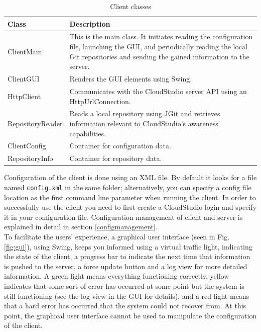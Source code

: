 \begin{table}

    \scriptsize
    \begin{tabularx}{\textwidth}{ | l | X | }
    \hline
\textbf{Class} & \textbf{Description} \\ \hline
ClientMain & This is the main class. It initiates reading the configuration file, launching the GUI, and periodically reading the local Git repositories and sending the gained information to the server. \\ \hline
ClientGUI & Renders the GUI elements using Swing. \\ \hline
HttpClient & Communicates with the CloudStudio server API using an HttpUrlConnection. \\ \hline
RepositoryReader & Reads a local repository using JGit and retrieves information relevant to CloudStudio's awareness capabilities. \\ \hline
ClientConfig & Container for configuration data. \\ \hline
RepositoryInfo & Container for repository data. \\ \hline
    \end{tabularx}
    
    \centering
  \caption{Client classes}
  \label{table:clientclasses}
\end{table}


Configuration of the client is done using an XML file. By default it looks for a file named \texttt{config.xml} in the same folder; alternatively, you can specify a config file location as the first command line parameter when running the client. In order to successfully use the client you need to first create a CloudStudio login and specify it in your configuration file. Configuration management of client and server is explained in detail in section \ref{configmanagement}. \\

To facilitate the users' experience, a graphical user interface (seen in Fig. \ref{fig:gui}), using Swing, keeps you informed using a virtual traffic light, indicating the state of the client, a progress bar to indicate the next time that information is pushed to the server, a force update button and a log view for more detailed information. A green light means everything functioning correctly, yellow indicates that some sort of error has occurred at some point but the system is still functioning (see the log view in the GUI for details), and a red light means that a hard error has occurred that the system could not recover from. At this point, the graphical user interface cannot be used to manipulate the configuration of the client. \\

